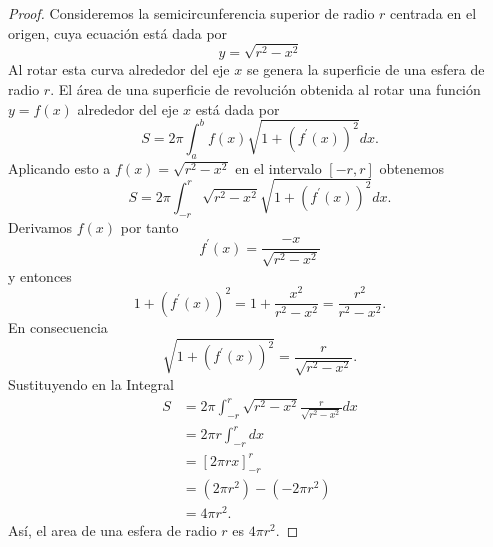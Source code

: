 \documentclass[12pt,a4paper]{article}
\begin{document}
    \begin{proof}
        Consideremos la semicircunferencia superior de radio $r$ centrada en el origen,
        cuya ecuación está dada por
        \begin{equation*}
            y=\sqrt{r^{2}-x^{2}}
        \end{equation*}
        Al rotar esta curva alrededor del eje $x$ se genera la superficie de una esfera de radio $r$.
        El área de una superficie de revolución obtenida al rotar una función $y=f(x)$ alrededor del
        eje $x$ está dada por
        \begin{equation*}
            S=2\pi\int_{a}^{b}f(x)\sqrt{1+(f^{\prime}(x))^{2}}dx.
        \end{equation*}
        Aplicando esto a $f(x)=\sqrt{r^{2}-x^{2}}$ en el intervalo $[-r,r]$ obtenemos
        \begin{equation*}
            S=2\pi\int_{-r}^{r}\sqrt{r^{2}-x^{2}}\sqrt{1+(f^{\prime}(x))^{2}}dx.
        \end{equation*}
        Derivamos $f(x)$ por tanto
        \begin{equation*}
            f^{\prime}(x)=\frac{-x}{\sqrt{r^{2}-x^{2}}}
        \end{equation*}
        y entonces
        \begin{equation*}
            1+(f^{\prime}(x))^{2}=1+\frac{x^{2}}{r^{2}-x^{2}}=\frac{r^{2}}{r^{2}-x^{2}}.
        \end{equation*}
        En consecuencia
        \begin{equation*}
            \sqrt{1+(f^{\prime}(x))^{2}}=\frac{r}{\sqrt{r^{2}-x^{2}}}.
        \end{equation*}
        Sustituyendo en la Integral
        \begin{align*}
            S&=2\pi\int_{-r}^{r}\sqrt{r^{2}-x^{2}}\frac{r}{\sqrt{r^{2}-x^{2}}}dx\\
            &=2\pi r\int_{-r}^{r}dx\\
            &=[2\pi rx]_{-r}^{r}\\
            &=(2\pi r^{2})-(-2\pi r^{2})\\
            &=4\pi r^{2}.
        \end{align*}
        Así, el area de una esfera de radio $r$ es $4\pi r^{2}$.
    \end{proof}
\end{document}
